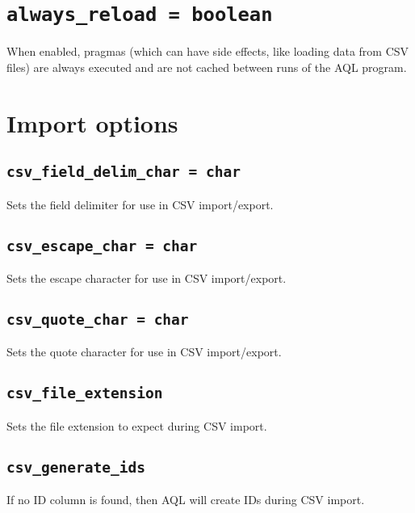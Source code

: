 \documentclass[10pt]{book}
\begin{document}
\section{{\tt always\_reload = boolean}}
When enabled, pragmas (which can have side effects, like loading data from CSV files) are always executed and are not cached between runs of the AQL program.

\section{Import options}
%

\subsection{{\tt csv\_field\_delim\_char = char}}
Sets the field delimiter for use in CSV import/export.

\subsection{{\tt csv\_escape\_char = char}}
Sets the escape character for use in CSV import/export.

\subsection{{\tt csv\_quote\_char = char}}
Sets the quote character for use in CSV import/export.

\subsection{{\tt csv\_file\_extension}}
Sets the file extension to expect during CSV import.

\subsection{{\tt csv\_generate\_ids}}
If no ID column is found, then AQL will create IDs during CSV import.
\end{document}
